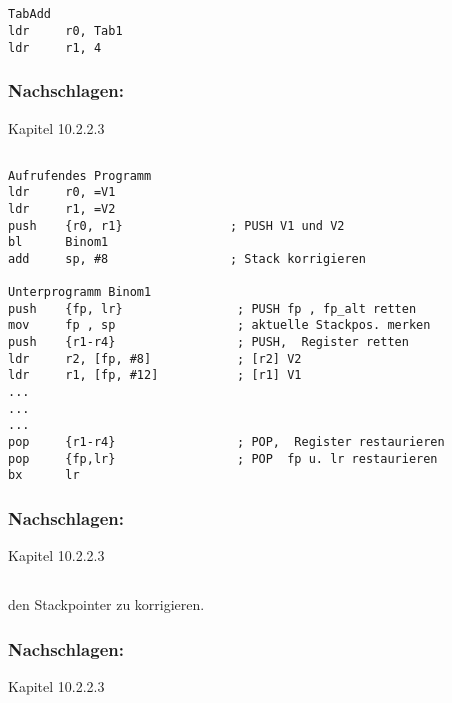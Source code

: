 \subsection{}
\begin{lstlisting}
TabAdd 
ldr		r0, Tab1   	
ldr	 	r1, 4 
\end{lstlisting}

\subsubsection{Nachschlagen:}
Kapitel 10.2.2.3

\subsection{}
\begin{lstlisting}
Aufrufendes Programm
ldr		r0, =V1 	
ldr	 	r1, =V2 	 
push 	{r0, r1}               ; PUSH V1 und V2 
bl      Binom1  
add 	sp, #8                 ; Stack korrigieren

Unterprogramm Binom1  
push   	{fp, lr} 				; PUSH fp , fp_alt retten 
mov 	fp , sp 				; aktuelle Stackpos. merken 
push   	{r1-r4}          		; PUSH,  Register retten 
ldr 	r2, [fp, #8]            ; [r2] V2 
ldr 	r1, [fp, #12]           ; [r1] V1                                 
...
...
...
pop 	{r1-r4}         		; POP,  Register restaurieren 
pop 	{fp,lr} 				; POP  fp u. lr restaurieren 
bx 		lr
\end{lstlisting}

\subsubsection{Nachschlagen:}
Kapitel 10.2.2.3

\subsection{}
den Stackpointer zu korrigieren.

\subsubsection{Nachschlagen:}
Kapitel 10.2.2.3